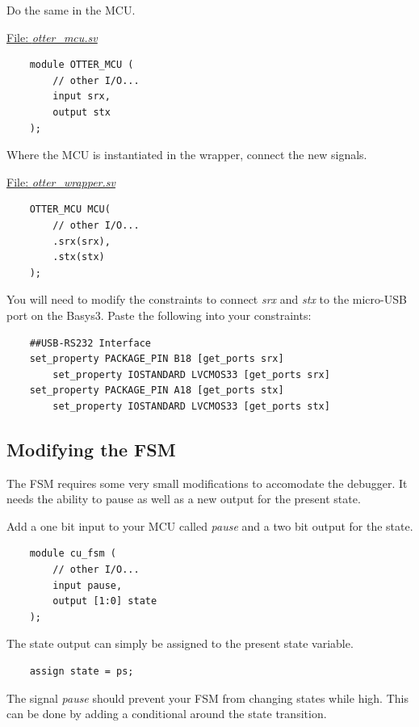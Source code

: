 \documentclass[10pt,a4paper]{article}
\begin{document}
\noindent Do the same in the MCU.

\medskip
\noindent\underline{File: \emph{otter\_mcu.sv}}
\begin{verbatim}
    module OTTER_MCU (
        // other I/O...
        input srx,
        output stx
    );
\end{verbatim}

\noindent Where the MCU is instantiated in the wrapper, connect the new signals.

\medskip
\noindent\underline{File: \emph{otter\_wrapper.sv}}
\begin{verbatim}
    OTTER_MCU MCU(
        // other I/O...
        .srx(srx),
        .stx(stx)
    );
\end{verbatim}

You will need to modify the constraints to connect \emph{srx} and \emph{stx} to the micro-USB port
on the Basys3. Paste the following into your constraints:

\begin{verbatim}
    ##USB-RS232 Interface
    set_property PACKAGE_PIN B18 [get_ports srx]
        set_property IOSTANDARD LVCMOS33 [get_ports srx]
    set_property PACKAGE_PIN A18 [get_ports stx]
        set_property IOSTANDARD LVCMOS33 [get_ports stx]
\end{verbatim}

\subsection{Modifying the FSM}
The FSM requires some very small modifications to accomodate the debugger. It needs the ability to
pause as well as a new output for the present state.

Add a one bit input to your MCU called \emph{pause} and a two bit output for the state.

\begin{verbatim}
    module cu_fsm (
        // other I/O...
        input pause,
        output [1:0] state
    );
\end{verbatim}

The state output can simply be assigned to the present state variable.

\begin{verbatim}
    assign state = ps;
\end{verbatim}

The signal \emph{pause} should prevent your FSM from changing states while high. This can be done
by adding a conditional around the state transition.
\end{document}
